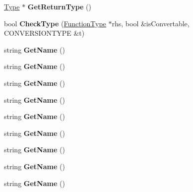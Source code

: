 \begin{DoxyCompactItemize}
\item 
\hypertarget{classFunctionType_a601e763553086c0d7a4c2de97d6de2bc}{\hyperlink{classType}{Type} $\ast$ {\bfseries Get\-Return\-Type} ()}\label{classFunctionType_a601e763553086c0d7a4c2de97d6de2bc}

\item 
\hypertarget{classFunctionType_a150840d05c02a26ca776aad22e0deed1}{bool {\bfseries Check\-Type} (\hyperlink{classFunctionType}{Function\-Type} $\ast$rhs, bool \&is\-Convertable, C\-O\-N\-V\-E\-R\-S\-I\-O\-N\-T\-Y\-P\-E \&t)}\label{classFunctionType_a150840d05c02a26ca776aad22e0deed1}

\item 
\hypertarget{classType_a8143fe4686ae1a5709a5955396c6ee26}{string {\bfseries Get\-Name} ()}\label{classType_a8143fe4686ae1a5709a5955396c6ee26}

\item 
\hypertarget{classType_a8143fe4686ae1a5709a5955396c6ee26}{string {\bfseries Get\-Name} ()}\label{classType_a8143fe4686ae1a5709a5955396c6ee26}

\item 
\hypertarget{classType_a8143fe4686ae1a5709a5955396c6ee26}{string {\bfseries Get\-Name} ()}\label{classType_a8143fe4686ae1a5709a5955396c6ee26}

\item 
\hypertarget{classType_a8143fe4686ae1a5709a5955396c6ee26}{string {\bfseries Get\-Name} ()}\label{classType_a8143fe4686ae1a5709a5955396c6ee26}

\item 
\hypertarget{classType_a8143fe4686ae1a5709a5955396c6ee26}{string {\bfseries Get\-Name} ()}\label{classType_a8143fe4686ae1a5709a5955396c6ee26}

\item 
\hypertarget{classType_a8143fe4686ae1a5709a5955396c6ee26}{string {\bfseries Get\-Name} ()}\label{classType_a8143fe4686ae1a5709a5955396c6ee26}

\item 
\hypertarget{classType_a8143fe4686ae1a5709a5955396c6ee26}{string {\bfseries Get\-Name} ()}\label{classType_a8143fe4686ae1a5709a5955396c6ee26}

\item 
\hypertarget{classType_a8143fe4686ae1a5709a5955396c6ee26}{string {\bfseries Get\-Name} ()}\label{classType_a8143fe4686ae1a5709a5955396c6ee26}

\item 
\hypertarget{classType_a8143fe4686ae1a5709a5955396c6ee26}{string {\bfseries Get\-Name} ()}\label{classType_a8143fe4686ae1a5709a5955396c6ee26}


\end{DoxyCompactItemize}
